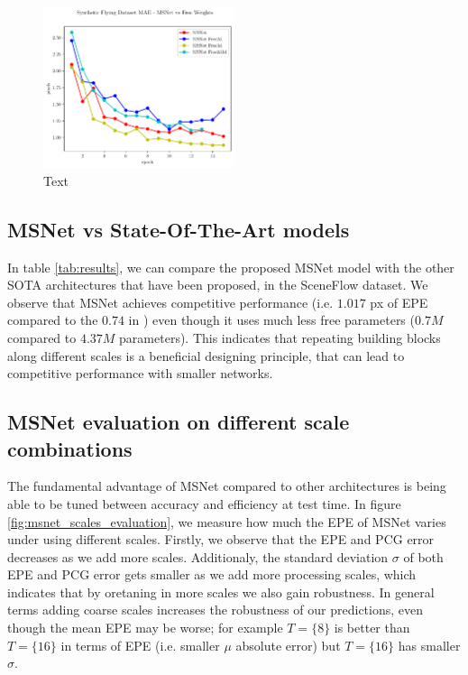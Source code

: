 \documentclass[runningheads]{llncs}
\begin{document}
\begin{figure}[t]
    \centering
    \includegraphics[width=0.5\textwidth]{figures/freiburg_msnet_vs_free_weights_mae.pdf}
    \caption{Text}
    \label{fig:mae_msnet_vs_free_weights}
\end{figure}

\subsection{MSNet vs State-Of-The-Art models}

In table \ref{tab:results}, we can compare the proposed MSNet model with the other SOTA architectures that have been proposed, in the SceneFlow dataset. We observe that MSNet achieves competitive performance (i.e. $1.017$ px of EPE compared to the $0.74$ in \cite{du2019amnet}) even though it uses much less free parameters ($0.7M$ compared to $4.37M$ parameters). This indicates that repeating building blocks along different scales is a beneficial designing principle, that can lead to competitive performance with smaller networks.  

\subsection{MSNet evaluation on different scale combinations}

The fundamental advantage of MSNet compared to other architectures is being able to be tuned between accuracy and efficiency at test time. In figure \ref{fig:msnet_scales_evaluation}, we measure how much the EPE of MSNet varies under using different scales. Firstly, we observe that the EPE and PCG error decreases as we add more scales. Additionaly, the standard deviation $\sigma$ of both EPE and PCG error gets smaller as we add more processing scales, which indicates that by oretaning in more scales we also gain robustness. In general terms adding coarse scales increases the robustness of our predictions, even though the mean EPE may be worse; for example $T=\{ 8 \}$ is better than $ T = \{ 16 \}$ in terms of EPE (i.e. smaller $\mu$ absolute error) but $ T = \{ 16 \}$ has smaller $\sigma$. 
\end{document}
